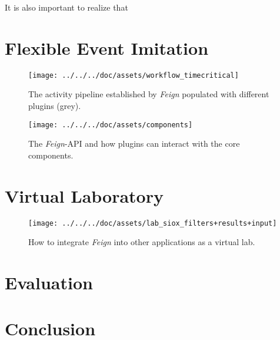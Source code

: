 \documentclass[]{article}
\begin{document}
It is also important to realize that 



\section{Flexible Event Imitation}
\label{sec:evaluation}	


\begin{figure*}
	\centering
	\texttt{[image: ../../../doc/assets/workflow\_timecritical]}
	\caption{The activity pipeline established by \emph{Feign} populated with different plugins (grey).}
	\label{fig:}
\end{figure*}

\begin{figure}[H]
	\centering
	\texttt{[image: ../../../doc/assets/components]}
	\caption{The \emph{Feign}-API and how plugins can interact with the core components.}
	\label{fig:}
\end{figure}



\section{Virtual Laboratory}
\label{sec:evaluation}

\begin{figure}[H]
	\centering
	\texttt{[image: ../../../doc/assets/lab\_siox\_filters+results+input]}
	\caption{How to integrate \emph{Feign} into other applications as a virtual lab.}
	\label{fig:}
\end{figure}


\section{Evaluation}
\label{sec:evaluation}

\section{Conclusion}
\label{sec:conclusion}


\newpage
\nocite{*}


\end{document}
